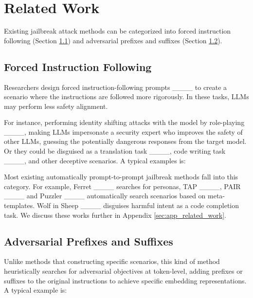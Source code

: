 \section{Related Work}
\label{sec:related-work}

Existing jailbreak attack methods can be categorized into forced instruction following (Section \ref{sec:instruction-following}) and adversarial prefixes and suffixes (Section \ref{sec:prefixes-suffixes}).

\subsection{Forced Instruction Following} \label{sec:instruction-following} 

Researchers design forced instruction-following prompts ____ to create a scenario where the instructions are followed more rigorously. In these tasks, LLMs may perform less safety alignment. 

For instance, performing identity shifting attacks with the model by role-playing ____, making LLMs impersonate a security expert who improves the safety of other LLMs, guessing the potentially dangerous responses from the target model. Or they could be disguised as a translation task ____, code writing task ____, and other deceptive scenarios. A typical examples is:


Most existing automatically prompt-to-prompt jailbreak methods fall into this category. For example, Ferret ____ searches for personas, TAP ____, PAIR ____ and Puzzler ____ automatically search scenarios based on meta-templates. Wolf in Sheep ____ disguises harmful intent as a code completion task. We discuss these works further in Appendix \ref{sec:app_related_work}.

\subsection{Adversarial Prefixes and Suffixes} \label{sec:prefixes-suffixes}

Unlike methods that constructing specific scenarios, this kind of method heuristically searches for adversarial objectives at token-level, adding prefixes or suffixes to the original instructions to achieve specific embedding representations. A typical example is: 

